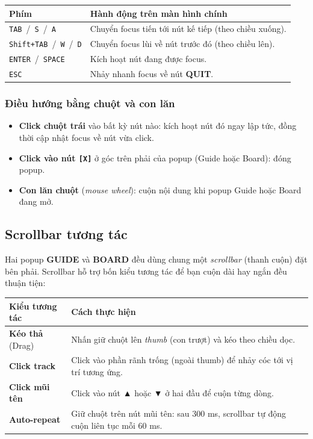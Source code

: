 \documentclass[12pt,a4paper]{article}
\begin{document}
\vspace{4pt}
\begin{tabularx}{\linewidth}{|l|X|}
    \hline
    \textbf{Phím} & \textbf{Hành động trên màn hình chính} \\
    \hline
    \texttt{TAB} \,/\, \texttt{S} \,/\, \texttt{A}                & Chuyển focus tiến tới nút kế tiếp (theo chiều xuống). \\
    \hline
    \texttt{Shift+TAB} \,/\, \texttt{W} \,/\, \texttt{D}          & Chuyển focus lùi về nút trước đó (theo chiều lên). \\
    \hline
    \texttt{ENTER} \,/\, \texttt{SPACE}                            & Kích hoạt nút đang được focus. \\
    \hline
    \texttt{ESC}                                                    & Nhảy nhanh focus về nút \textbf{QUIT}. \\
    \hline
\end{tabularx}

\subsubsection{Điều hướng bằng chuột và con lăn}
\begin{itemize}
    \item \textbf{Click chuột trái} vào bất kỳ nút nào: kích hoạt nút đó ngay lập tức, đồng thời cập nhật focus về nút vừa click.
    \item \textbf{Click vào nút \texttt{[X]}} ở góc trên phải của popup (Guide hoặc Board): đóng popup.
    \item \textbf{Con lăn chuột} (\textit{mouse wheel}): cuộn nội dung khi popup Guide hoặc Board đang mở.
\end{itemize}

\subsection{Scrollbar tương tác}
Hai popup \textbf{GUIDE} và \textbf{BOARD} đều dùng chung một \textit{scrollbar} (thanh cuộn) đặt bên phải. Scrollbar hỗ trợ bốn kiểu tương tác để bạn cuộn dài hay ngắn đều thuận tiện:

\vspace{4pt}
\begin{tabularx}{\linewidth}{|l|X|}
    \hline
    \textbf{Kiểu tương tác} & \textbf{Cách thực hiện} \\
    \hline
    \textbf{Kéo thả} (Drag)         & Nhấn giữ chuột lên \textit{thumb} (con trượt) và kéo theo chiều dọc. \\
    \hline
    \textbf{Click track}            & Click vào phần rãnh trống (ngoài thumb) để nhảy cóc tới vị trí tương ứng. \\
    \hline
    \textbf{Click mũi tên}          & Click vào nút ▲ hoặc ▼ ở hai đầu để cuộn từng dòng. \\
    \hline
    \textbf{Auto-repeat}            & Giữ chuột trên nút mũi tên: sau 300 ms, scrollbar tự động cuộn liên tục mỗi 60 ms. \\
    \hline
\end{tabularx}
\end{document}
